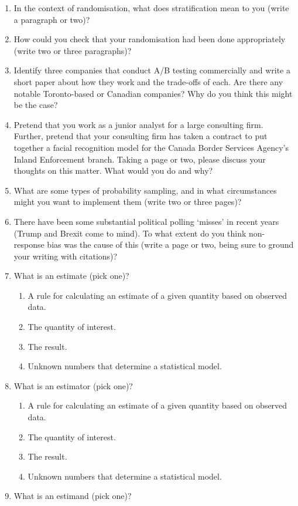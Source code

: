 \documentclass[
]{book}
\providecommand{\tightlist}{%
  \setlength{\itemsep}{0pt}\setlength{\parskip}{0pt}}
\begin{document}
\begin{enumerate}
\def\labelenumi{\arabic{enumi}.}
\setcounter{enumi}{4}
\tightlist
\item
  In the context of randomisation, what does stratification mean to you (write a paragraph or two)?
\item
  How could you check that your randomisation had been done appropriately (write two or three paragraphs)?
\item
  Identify three companies that conduct A/B testing commercially and write a short paper about how they work and the trade-offs of each. Are there any notable Toronto-based or Canadian companies? Why do you think this might be the case?
\item
  Pretend that you work as a junior analyst for a large consulting firm. Further, pretend that your consulting firm has taken a contract to put together a facial recognition model for the Canada Border Services Agency's Inland Enforcement branch. Taking a page or two, please discuss your thoughts on this matter. What would you do and why?
\item
  What are some types of probability sampling, and in what circumstances might you want to implement them (write two or three pages)?
\item
  There have been some substantial political polling `misses' in recent years (Trump and Brexit come to mind). To what extent do you think non-response bias was the cause of this (write a page or two, being sure to ground your writing with citations)?
\item
  What is an estimate (pick one)?

  \begin{enumerate}
  \def\labelenumii{\alph{enumii}.}
  \tightlist
  \item
    A rule for calculating an estimate of a given quantity based on observed data.
  \item
    The quantity of interest.
  \item
    The result.
  \item
    Unknown numbers that determine a statistical model.
  \end{enumerate}
\item
  What is an estimator (pick one)?

  \begin{enumerate}
  \def\labelenumii{\alph{enumii}.}
  \tightlist
  \item
    A rule for calculating an estimate of a given quantity based on observed data.
  \item
    The quantity of interest.
  \item
    The result.
  \item
    Unknown numbers that determine a statistical model.
  \end{enumerate}
\item
  What is an estimand (pick one)?


\end{enumerate}
\end{document}
